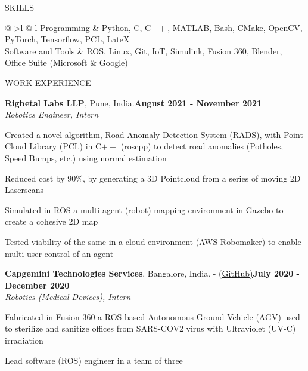 \documentclass{resume} %
\begin{document}
\begin{rSection}{SKILLS}

\begin{tabular}{ @ {} >{\bfseries}l @{\hspace{3ex}} l }
Programming &  Python, C, C$++$, MATLAB, Bash, CMake,  OpenCV, PyTorch, Tensorflow, PCL, LateX \\
Software and Tools & ROS, Linux, Git, IoT, Simulink, Fusion 360, Blender, Office Suite (Microsoft \& Google)\\
\end{tabular}
\end{rSection}


\begin{rSection}{WORK EXPERIENCE}

\begin{rSubsectiond}{\textbf{Rigbetal Labs LLP}, Pune, India.}{\textbf{August 2021 - November 2021} \\\textit{Robotics Engineer, Intern}}
    \item Created a novel algorithm, Road Anomaly Detection System (RADS), with Point Cloud Library (PCL) in C$++$ (roscpp) to detect road anomalies (Potholes, Speed Bumps, etc.) using normal estimation
    \item Reduced cost by 90\%, by generating a 3D Pointcloud from a series of moving 2D Laserscans
    \item Simulated in ROS a multi-agent (robot) mapping environment in Gazebo to create a cohesive 2D map
    \item Tested viability of the same in a cloud environment (AWS Robomaker) to enable multi-user control of an agent
\end{rSubsectiond}

\begin{rSubsectiond}{\textbf{Capgemini Technologies Services}, Bangalore, India. - \href{https://github.com/Sahas-Ananth/ROS-ASV}{(GitHub)}}{\textbf{July 2020 - December 2020} \\\textit{Robotics (Medical Devices), Intern}}
    \item Fabricated in Fusion 360 a ROS-based Autonomous Ground Vehicle (AGV) used to sterilize and sanitize offices from SARS-COV2 virus with Ultraviolet (UV-C) irradiation
    \item Lead software (ROS) engineer in a team of three
\end{rSubsectiond}

\end{rSection}
\end{document}
